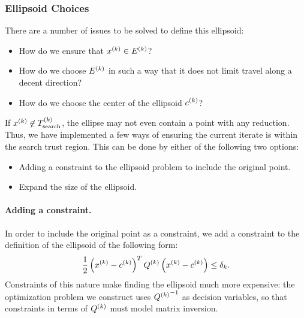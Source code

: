 \subsubsection{Ellipsoid Choices}

There are a number of issues to be solved to define this ellipsoid:
\begin{itemize}
\item How do we ensure that $x^{(k)} \in {E^{(k)}} $?
\item How do we choose ${E^{(k)}}$ in such a way that it does not limit travel along a decent direction?
\item How do we choose the center of the ellipsoid ${c^{(k)}}$?
\end{itemize}


If $x^{(k)} \not \in {T_{\text{search}}^{(k)}} $, the ellipse may not even contain a point with any reduction.
Thus, we have implemented a few ways of ensuring the current iterate is within the search trust region.
This can be done by either of the following two options:
\begin{itemize}
\item Adding a constraint to the ellipsoid problem to include the original point.
\item Expand the size of the ellipsoid.
\end{itemize}


\paragraph{Adding a constraint.}
In order to include the original point as a constraint, we add a constraint to the definition of the ellipsoid of the following form:
\begin{align*}
\frac 1 2 \left(x^{(k)} - {c^{(k)}}\right)^T{Q^{(k)}}\left(x^{(k)} - {c^{(k)}}\right) \le {\delta_k}.
\end{align*}
Constraints of this nature make finding the ellipsoid much more expensive:
the optimization problem we construct uses ${{Q^{(k)}}}^{-1}$ as decision variables, so that constraints in terms of ${Q^{(k)}}$ must model matrix inversion.

